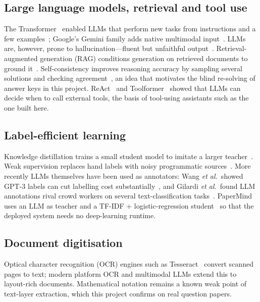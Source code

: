 \subsection{Large language models, retrieval and tool use}
The Transformer~\cite{vaswani2017} enabled LLMs that perform new tasks from instructions and a few
examples~\cite{brown2020}; Google's Gemini family adds native multimodal input~\cite{gemini2023}. LLMs are, however,
prone to hallucination---fluent but unfaithful output~\cite{ji2023}. Retrieval-augmented generation (RAG) conditions
generation on retrieved documents to ground it~\cite{lewis2020}. Self-consistency improves reasoning accuracy by sampling
several solutions and checking agreement~\cite{wang2023sc}, an idea that motivates the blind re-solving of answer keys
in this project. ReAct~\cite{yao2023} and Toolformer~\cite{schick2023} showed that LLMs can decide when to call external
tools, the basis of tool-using assistants such as the one built here.

\subsection{Label-efficient learning}
Knowledge distillation trains a small student model to imitate a larger teacher~\cite{hinton2015}. Weak supervision
replaces hand labels with noisy programmatic sources~\cite{ratner2017}. More recently LLMs themselves have been used as
annotators: Wang \emph{et al.}\ showed GPT-3 labels can cut labelling cost substantially~\cite{wang2021gpt3label}, and
Gilardi \emph{et al.}\ found LLM annotations rival crowd workers on several text-classification
tasks~\cite{gilardi2023}. PaperMind uses an LLM as teacher and a TF-IDF + logistic-regression student~\cite{pedregosa2011}
so that the deployed system needs no deep-learning runtime.

\subsection{Document digitisation}
Optical character recognition (OCR) engines such as Tesseract~\cite{smith2007} convert scanned pages to text; modern
platform OCR and multimodal LLMs extend this to layout-rich documents. Mathematical notation remains a known weak point
of text-layer extraction, which this project confirms on real question papers.

